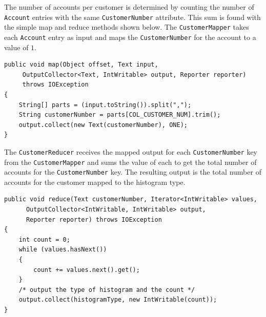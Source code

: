 The number of accounts per customer is determined by counting the number of \texttt{Account} entries with the same \texttt{CustomerNumber} attribute. This sum is found with the simple map and reduce methods shown below. The \texttt{CustomerMapper} takes each \texttt{Account} entry as input and maps the \texttt{CustomerNumber} for the account to a value of $1$. 
% 
{
\singlespace
\small
\begin{verbatim}
public void map(Object offset, Text input, 
     OutputCollector<Text, IntWritable> output, Reporter reporter) 
     throws IOException 
{
    String[] parts = (input.toString()).split(",");
    String customerNumber = parts[COL_CUSTOMER_NUM].trim();
    output.collect(new Text(customerNumber), ONE);
}
\end{verbatim}
}
The \texttt{CustomerReducer} receives the mapped output for each \texttt{CustomerNumber} key from the \texttt{CustomerMapper} and sums the value of each to get the total number of accounts for the \texttt{CustomerNumber} key. The resulting output is the total number of accounts for the customer mapped to the histogram type. 
% 
{
\singlespace
\small
\begin{verbatim}
public void reduce(Text customerNumber, Iterator<IntWritable> values,
      OutputCollector<IntWritable, IntWritable> output,
      Reporter reporter) throws IOException 
{
    int count = 0;
    while (values.hasNext())
    {
        count += values.next().get();
    }
    /* output the type of histogram and the count */
    output.collect(histogramType, new IntWritable(count));
}
\end{verbatim}
}

